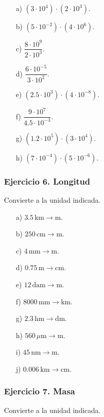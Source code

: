 \begin{enumerate}
    \item[a)] $(3\cdot10^4)\cdot(2\cdot10^3)$.
    \item[b)] $(5\cdot10^{-2})\cdot(4\cdot10^6)$.
    \item[c)] $\dfrac{8\cdot10^9}{2\cdot10^3}$.
    \item[d)] $\dfrac{6\cdot10^{-5}}{3\cdot10^2}$.
    \item[e)] $(2.5\cdot10^3)\cdot(4\cdot10^{-8})$.
    \item[f)] $\dfrac{9\cdot10^7}{4.5\cdot10^{-3}}$.
    \item[g)] $(1.2\cdot10^5)\cdot(3\cdot10^4)$.
    \item[h)] $(7\cdot10^{-4})\cdot(5\cdot10^{-6})$.
\end{enumerate}

\subsubsection*{Ejercicio 6. Longitud}

Convierte a la unidad indicada.

\begin{enumerate}
    \item[a)] $3.5\,\mathrm{km}\rightarrow\mathrm{m}$.
    \item[b)] $250\,\mathrm{cm}\rightarrow\mathrm{m}$.
    \item[c)] $4\,\mathrm{mm}\rightarrow\mathrm{m}$.
    \item[d)] $0.75\,\mathrm{m}\rightarrow\mathrm{cm}$.
    \item[e)] $12\,\mathrm{dam}\rightarrow\mathrm{m}$.
    \item[f)] $8000\,\mathrm{mm}\rightarrow\mathrm{km}$.
    \item[g)] $2.3\,\mathrm{hm}\rightarrow\mathrm{dm}$.
    \item[h)] $560\,\mu\mathrm{m}\rightarrow\mathrm{m}$.
    \item[i)] $45\,\mathrm{nm}\rightarrow\mathrm{m}$.
    \item[j)] $0.006\,\mathrm{km}\rightarrow\mathrm{cm}$.
\end{enumerate}

\subsubsection*{Ejercicio 7. Masa}

Convierte a la unidad indicada.


